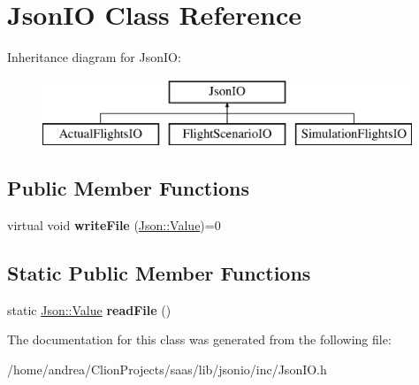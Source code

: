 \hypertarget{class_json_i_o}{}\section{Json\+IO Class Reference}
\label{class_json_i_o}
Inheritance diagram for Json\+IO\+:\begin{figure}[H]
\begin{center}
\leavevmode
\includegraphics[height=2.000000cm]{class_json_i_o}
\end{center}
\end{figure}
\subsection*{Public Member Functions}
\begin{DoxyCompactItemize}
\item 
virtual void {\bfseries write\+File} (\hyperlink{class_json_1_1_value}{Json\+::\+Value})=0\hypertarget{class_json_i_o_af6f8a61815323ac89752b5365fb2acab}{}\label{class_json_i_o_af6f8a61815323ac89752b5365fb2acab}

\end{DoxyCompactItemize}
\subsection*{Static Public Member Functions}
\begin{DoxyCompactItemize}
\item 
static \hyperlink{class_json_1_1_value}{Json\+::\+Value} {\bfseries read\+File} ()\hypertarget{class_json_i_o_a95a39d392f3f27bb94dc5ad5ef3dba19}{}\label{class_json_i_o_a95a39d392f3f27bb94dc5ad5ef3dba19}

\end{DoxyCompactItemize}


The documentation for this class was generated from the following file\+:\begin{DoxyCompactItemize}
\item 
/home/andrea/\+Clion\+Projects/saas/lib/jsonio/inc/Json\+I\+O.\+h\end{DoxyCompactItemize}
